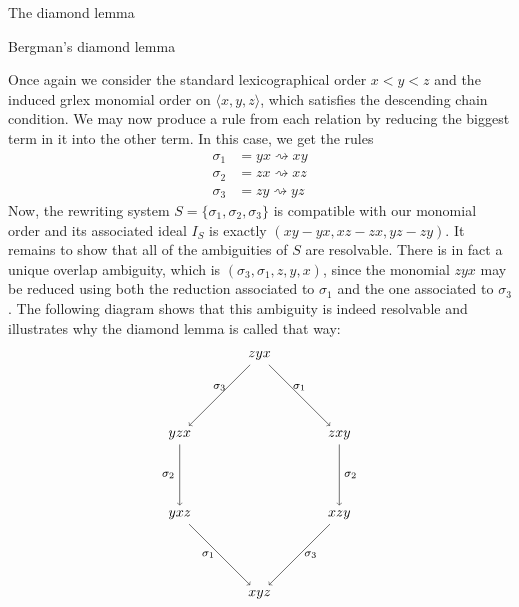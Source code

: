 \begin{chapter}{The diamond lemma}
\begin{section}{Bergman's diamond lemma}
\begin{exmp}
Once again we consider the standard lexicographical order $x<y<z$ and the induced grlex monomial order on $\langle x,y,z\rangle$, which satisfies the descending chain condition. We may now produce a rule from each relation by reducing the biggest term in it into the other term. In this case, we get the rules
\begin{align*}
\sigma_1 &= yx \rightsquigarrow xy\\
\sigma_2 &= zx \rightsquigarrow xz\\
\sigma_3 &= zy \rightsquigarrow yz
\end{align*}
Now, the rewriting system $S=\{\sigma_1, \sigma_2, \sigma_3\}$ is compatible with our monomial order and its associated ideal $I_S$ is exactly $(xy-yx, xz-zx, yz-zy)$. It remains to show that all of the ambiguities of $S$ are resolvable. There is in fact a unique overlap ambiguity, which is $(\sigma_3, \sigma_1, z, y, x)$, since the monomial $zyx$ may be reduced using both the reduction associated to $\sigma_1$ and the one associated to $\sigma_3$. The following diagram shows that this ambiguity is indeed resolvable and illustrates why the diamond lemma is called that way:
\[
\begin{tikzpicture}
\node (1) at (0,0) {$zyx$};
\node (a1) at (-2,-2) {$yzx$};
\node (a2) at (2,-2) {$zxy$};
\node (b1) at (-2,-4) {$yxz$};
\node (b2) at (2,-4) {$xzy$};
\node (c) at (0,-6) {$xyz$};

\draw[->] (1) to node[above, font=\footnotesize]{$\sigma_3$} (a1);
\draw[->] (1) to node[above, font=\footnotesize]{$\sigma_1$} (a2);
\draw[->] (a1) to node[left, font=\footnotesize]{$\sigma_2$} (b1);
\draw[->] (a2) to node[right, font=\footnotesize]{$\sigma_2$} (b2);
\draw[->] (b1) to node[left, font=\footnotesize]{$\sigma_1$} (c);
\draw[->] (b2) to node[right, font=\footnotesize]{$\sigma_3$} (c);
\end{tikzpicture}
\]


\end{exmp}
\end{section}
\end{chapter}

